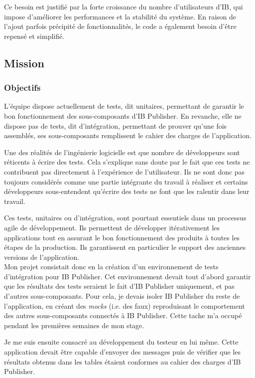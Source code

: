 \documentclass[11pt, oneside, titlepage, a4paper]{article}
\begin{document}
Ce besoin est justifié par la forte croissance du nombre d'utilisateurs d'IB, qui impose d'améliorer les performances et la stabilité du système. En raison de l'ajout parfois précipité de fonctionnalités, le code a également besoin d'être repensé et simplifié.
	\subsection{Mission}
		\subsubsection{Objectifs}
L'équipe dispose actuellement de tests, dit unitaires, permettant de garantir le bon fonctionnement des sous-composants d'IB Publisher. En revanche, elle ne dispose pas de tests, dit d'intégration, permettant de prouver qu'une fois assemblés, ses sous-composants remplissent le cahier des charges de l'application.

Une des réalités de l'ingénierie logicielle est que nombre de développeurs sont réticents à écrire des tests. Cela s'explique sans doute par le fait que ces tests ne contribuent pas directement à l'expérience de l'utilisateur. Ils ne sont donc pas toujours considérés comme une partie intégrante du travail à réaliser et certains développeurs sous-entendent qu'écrire des tests ne font que les ralentir dans leur travail.

Ces tests, unitaires ou d'intégration, sont pourtant essentiels dans un processus agile de développement. Ils permettent de développer itérativement les applications tout en assurant le bon fonctionnement des produits à toutes les étapes de la production. Ils garantissent en particulier le support des anciennes versions de l'application.
\\

Mon projet consistait donc en la création d'un environnement de tests d'intégration pour IB Publisher. Cet environnement devait tout d'abord garantir que les résultats des tests seraient le fait d'IB Publisher uniquement, et pas d'autres sous-composants. Pour cela, je devais isoler IB Publisher du reste de l'application, en créant des \textit{mocks} (i.e. des faux) reproduisant le comportement des autres sous-composants connectés à IB Publisher. Cette tache m'a occupé pendant les premières semaines de mon stage.

Je me suis ensuite consacré au développement du testeur en lui même. Cette application devait être capable d'envoyer des messages puis de vérifier que les résultats obtenus dans les tables étaient conformes au cahier des charges d'IB Publisher.
\end{document}
